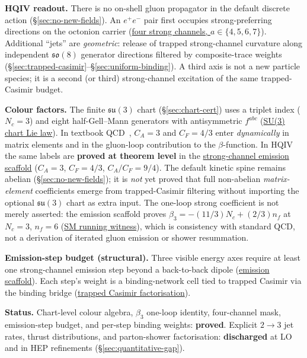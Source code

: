\documentclass[11pt]{amsart}
\begin{document}
\textbf{HQIV readout.} There is no on-shell gluon propagator in the default discrete
action (\S\ref{sec:no-new-fields}). An $e^+e^-$ pair first occupies strong-preferring
directions on the octonion carrier (\hyperref[lean:force-sector]{four strong channels,
$a\in\{4,5,6,7\}$}). Additional ``jets'' are \emph{geometric}: release of trapped
strong-channel curvature along independent $\mathfrak{so}(8)$ generator directions
filtered by composite-trace weights (\S\ref{sec:trapped-casimir}--\S\ref{sec:uniform-binding}).
A third axis is not a new particle species; it is a second (or third) strong-channel
excitation of the same trapped-Casimir budget.

\textbf{Colour factors.} The finite $\mathfrak{su}(3)$ chart (\S\ref{sec:chart-cert})
uses a triplet index ($N_c=3$) and eight half-Gell--Mann generators with antisymmetric
$f^{abc}$ (\hyperref[lean:su3-chart-law]{SU(3) chart Lie law}). In textbook
QCD~\cite{peskin1995,pdg2024},
$C_A=3$ and $C_F=4/3$ enter \emph{dynamically} in matrix elements and in the
gluon-loop contribution to the $\beta$-function. In HQIV
the same labels are \textbf{proved at theorem level} in the
\hyperref[lean:emission-scaffold]{strong-channel emission scaffold}
($C_A=3$, $C_F=4/3$, $C_A/C_F=9/4$).
The default kinetic spine remains abelian (\S\ref{sec:no-new-fields}); it is \emph{not}
yet proved that full non-abelian \emph{matrix-element} coefficients emerge from
trapped-Casimir filtering without importing the optional $\mathfrak{su}(3)$ chart as
extra input. The one-loop strong coefficient is not merely asserted: the emission
scaffold proves $\beta_3=-(11/3)N_c+(2/3)n_f$ at $N_c=3$, $n_f=6$
(\hyperref[lean:beta3-witness]{SM running witness}), which is consistency with
standard QCD, not a derivation of iterated gluon emission or shower resummation.

\textbf{Emission-step budget (structural).} Three visible energy axes require at least
one strong-channel emission step beyond a back-to-back dipole
(\hyperref[lean:emission-scaffold]{emission scaffold}). Each step's weight is a
binding-network cell tied to trapped Casimir via the binding bridge
(\hyperref[lean:trapped-casimir-bridge]{trapped Casimir factorisation}).

\textbf{Status.} Chart-level colour algebra, $\beta_3$ one-loop identity, four-channel
mask, emission-step budget, and per-step binding weights: \textbf{proved}.
Explicit $2\to3$ jet rates, thrust distributions, and parton-shower factorisation:
\textbf{discharged} at LO and in HEP refinements (\S\ref{sec:quantitative-gap}).
\end{document}
